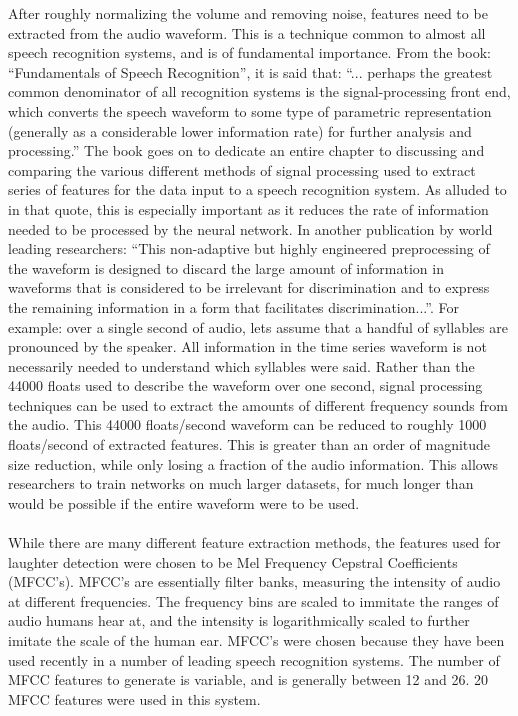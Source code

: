 \documentclass[a4paper,11pt,notitlepage]{article}
\begin{document}
After roughly normalizing the volume and removing noise, features need to be extracted from the audio waveform. This is a technique common to almost all speech recognition systems, and is of fundamental importance. From the book: ``Fundamentals of Speech Recognition'', it is said that: ``... perhaps the greatest common denominator of all recognition systems is the signal-processing front end, which converts the speech waveform to some type of parametric representation (generally as a considerable lower information rate) for further analysis and processing.''\cite{rabiner1993fundamentals} The book goes on to dedicate an entire chapter to discussing and comparing the various different methods of signal processing used to extract series of features for the data input to a speech recognition system. As alluded to in that quote, this is especially important as it reduces the rate of information needed to be processed by the neural network. In another publication by world leading researchers: ``This non-adaptive but highly engineered preprocessing of the waveform is designed to discard the large amount of information in waveforms that is considered to be irrelevant for discrimination and to express the remaining information in a form that facilitates discrimination...''.\cite{hinton2012deep} For example: over a single second of audio, lets assume that a handful of syllables are pronounced by the speaker. All information in the time series waveform is not necessarily needed to understand which syllables were said. Rather than the 44000 floats used to describe the waveform over one second, signal processing techniques can be used to extract the amounts of different frequency sounds from the audio. This 44000 floats/second waveform can be reduced to roughly 1000 floats/second of extracted features. This is greater than an order of magnitude size reduction, while only losing a fraction of the audio information. This allows researchers to train networks on much larger datasets, for much longer than would be possible if the entire waveform were to be used.\\
\\
While there are many different feature extraction methods, the features used for laughter detection were chosen to be Mel Frequency Cepstral Coefficients (MFCC's). MFCC's are essentially filter banks, measuring the intensity of audio at different frequencies. The frequency bins are scaled to immitate the ranges of audio humans hear at, and the intensity is logarithmically scaled to further imitate the scale of the human ear. MFCC's were chosen because they have been used recently in a number of leading speech recognition systems.\cite{mozilladeepspeech} The number of MFCC features to generate is variable, and is generally between 12 and 26. 20 MFCC features were used in this system.\\
\end{document}
